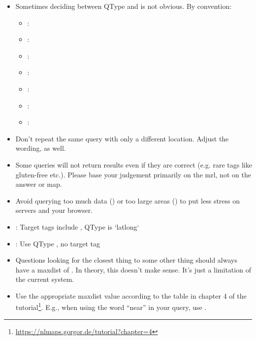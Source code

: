 \begin{itemize}
\item Sometimes deciding between QType  and  is not obvious. By convention:
  \begin{itemize}
  \item {}: 
  \item {}: 
  \item {}: 
  \item {}:\\
  \item {}: 
  \item {}: 
  \item {}: 
  \end{itemize}
\item Don’t repeat the same query with only a different location. Adjust the wording, as well.
\item Some queries will not return results even if they are correct (e.g. rare
  tags like gluten-free etc.). Please base your judgement primarily on the mrl,
  not on the answer or map.
\item Avoid querying too much data () or too large areas
  () to put less stress on servers and your
  browser.
\item {}: Target
  tags include , QType is `latlong`
\item {}: Use QType
  , no  target tag
\item Questions looking for the closest thing to some other thing should always
  have a maxdist of . In theory, this doesn’t make sense. It’s
  just a limitation of the current system.
\item Use the appropriate maxdist value according to the table in chapter 4 of
  the tutorial\footnote{\url{https://nlmaps.gorgor.de/tutorial?chapter=4}}.
  E.g., when using the word “near” in your query, use .
\end{itemize}

